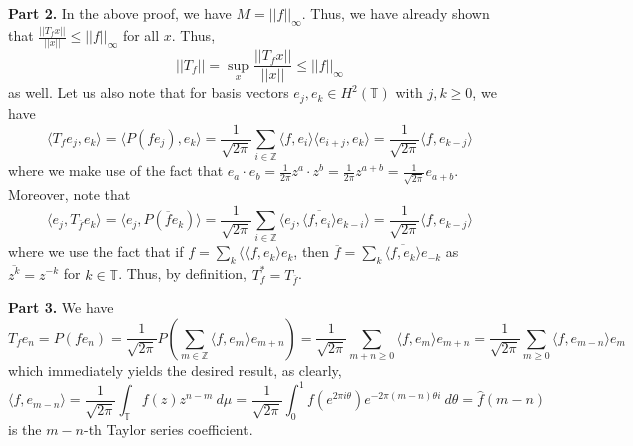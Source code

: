 \documentclass[aps,pra,showpacs,notitlepage,onecolumn,superscriptaddress,nofootinbib]{revtex4-1}
\theoremstyle{definition}
\begin{document}
\noindent \textbf{Part 2.} In the above proof, we have $M = ||f||_{\infty}$. Thus, we have already shown that $\frac{||T_f x||}{||x||} \leq ||f||_{\infty}$ for all $x$. Thus,
\begin{equation}
  ||T_f|| = \sup_{x} \frac{||T_f x||}{||x||} \leq ||f||_{\infty}
\end{equation}
as well. Let us also note that for basis vectors $e_j, e_k \in H^2(\mathbb{T})$ with $j, k \geq 0$, we have
\begin{equation}
  \langle T_f e_j, e_k \rangle = \langle P(f e_j), e_k \rangle = \frac{1}{\sqrt{2\pi}} \displaystyle\sum_{i \in \mathbb{Z}} \langle f, e_i \rangle \langle e_{i + j}, e_k \rangle = \frac{1}{\sqrt{2\pi}} \langle f, e_{k - j} \rangle
\end{equation}
where we make use of the fact that $e_a \cdot e_b = \frac{1}{2\pi} z^{a} \cdot z^{b} = \frac{1}{2\pi} z^{a + b} = \frac{1}{\sqrt{2\pi}} e_{a + b}$. Moreover, note that
\begin{equation}
  \langle e_j, T_{\overline{f}} e_k \rangle = \langle e_j, P(\overline{f} e_k) \rangle = \frac{1}{\sqrt{2\pi}} \displaystyle\sum_{i \in \mathbb{Z}}  \langle e_{j}, \overline{\langle f, e_i \rangle} e_{k - i} \rangle = \frac{1}{\sqrt{2\pi}} \langle f, e_{k - j} \rangle
  \end{equation}
where we use the fact that if $f = \sum_{k} \langle \langle f, e_k \rangle e_k$, then $\overline{f} = \sum_{k} \overline{\langle f, e_k \rangle} e_{-k}$ as $\overline{z^k} = z^{-k}$ for $k \in \mathbb{T}$. Thus, by
definition, $T_f^{*} = T_{\overline{f}}$.
\newline

\noindent \textbf{Part 3.} We have
\begin{equation}
  T_f e_n = P(f e_n) = \frac{1}{\sqrt{2\pi}} P \left( \displaystyle\sum_{m \in \mathbb{Z}} \langle f, e_m \rangle e_{m + n} \right) =  \frac{1}{\sqrt{2\pi}} \displaystyle\sum_{m + n \geq 0} \langle f, e_m \rangle e_{m + n} =
  \frac{1}{\sqrt{2\pi}} \displaystyle\sum_{m \geq 0} \langle f, e_{m - n} \rangle e_{m}
\end{equation}
which immediately yields the desired result, as clearly,
\begin{equation}
  \langle f, e_{m - n} \rangle = \frac{1}{\sqrt{2\pi}} \displaystyle\int_{\mathbb{T}} f(z) z^{n - m} \ d\mu = \frac{1}{\sqrt{2\pi}} \displaystyle\int_{0}^{1} f(e^{2 \pi i\theta}) e^{-2\pi (m - n) \theta i} \ d\theta = \hat{f}(m - n)
\end{equation}
is the $m - n$-th Taylor series coefficient.
\newline
\end{document}
